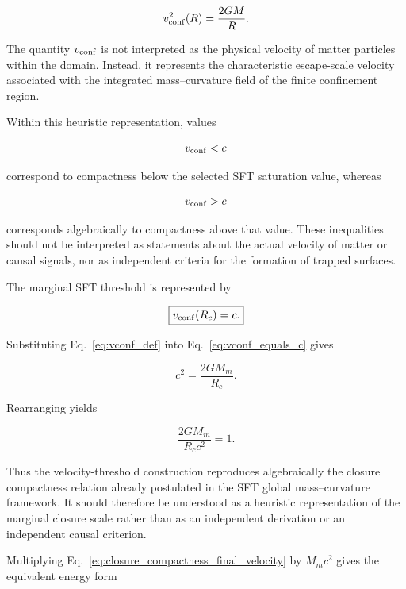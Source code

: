 \documentclass[12pt]{article}
\begin{document}
\begin{equation}
v_{\rm conf}^2(R)
=
\frac{2GM}{R}.
\label{eq:vconf_def}
\end{equation}

The quantity \(v_{\rm conf}\) is not interpreted as the physical
velocity of matter particles within the domain. Instead, it represents
the characteristic escape-scale velocity associated with the integrated
mass--curvature field of the finite confinement region.

Within this heuristic representation, values

\begin{equation}
v_{\rm conf}<c
\end{equation}

correspond to compactness below the selected SFT saturation value,
whereas

\begin{equation}
v_{\rm conf}>c
\end{equation}

corresponds algebraically to compactness above that value. These
inequalities should not be interpreted as statements about the actual
velocity of matter or causal signals, nor as independent criteria for
the formation of trapped surfaces.

The marginal SFT threshold is represented by

\begin{equation}
\boxed{
v_{\rm conf}(R_c)=c.
}
\label{eq:vconf_equals_c}
\end{equation}

Substituting Eq.~\eqref{eq:vconf_def} into
Eq.~\eqref{eq:vconf_equals_c} gives

\begin{equation}
c^2
=
\frac{2GM_m}{R_c}.
\end{equation}

Rearranging yields

\begin{equation}
\boxed{
\frac{2GM_m}{R_c c^2}
=
1.
}
\label{eq:closure_compactness_final_velocity}
\end{equation}

Thus the velocity-threshold construction reproduces algebraically the
closure compactness relation already postulated in the SFT global
mass--curvature framework. It should therefore be understood as a
heuristic representation of the marginal closure scale rather than as
an independent derivation or an independent causal criterion.

Multiplying Eq.~\eqref{eq:closure_compactness_final_velocity} by
\(M_m c^2\) gives the equivalent energy form
\end{document}

